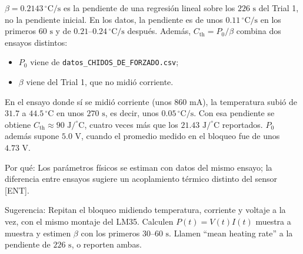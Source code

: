 \documentclass{LabDSTresponse}
\begin{document}
{$\beta = 0.2143\,^\circ\text{C/s}$ es la pendiente de una regresión lineal sobre los $226\text{ s}$ del Trial 1, no la pendiente inicial. En los datos, la pendiente es de unos $0.11\,^\circ\text{C/s}$ en los primeros $60\text{ s}$ y de $0.21\text{--}0.24\,^\circ\text{C/s}$ después. Además, $C_{\text{th}} = P_0/\beta$ combina dos ensayos distintos:
\begin{itemize}
    \item $P_0$ viene de \texttt{datos\_CHIDOS\_DE\_FORZADO.csv};
    \item $\beta$ viene del Trial 1, que no midió corriente.
\end{itemize}
En el ensayo donde sí se midió corriente (unos $860\text{ mA}$), la temperatura subió de $31.7$ a $44.5\,^\circ\text{C}$ en unos $270\text{ s}$, es decir, unos $0.05\,^\circ\text{C/s}$. Con esa pendiente se obtiene $C_{\text{th}} \approx 90\text{ J/}^\circ\text{C}$, cuatro veces más que los $21.43\text{ J/}^\circ\text{C}$ reportados. $P_0$ además supone $5.0\text{ V}$, cuando el promedio medido en el bloqueo fue de unos $4.73\text{ V}$.

Por qué: Los parámetros físicos se estiman con datos del mismo ensayo; la diferencia entre ensayos sugiere un acoplamiento térmico distinto del sensor [ENT].

Sugerencia: Repitan el bloqueo midiendo temperatura, corriente y voltaje a la vez, con el mismo montaje del LM35. Calculen $P(t) = V(t)I(t)$ muestra a muestra y estimen $\beta$ con los primeros $30\text{--}60\text{ s}$. Llamen “mean heating rate” a la pendiente de $226\text{ s}$, o reporten ambas.}
\end{document}
